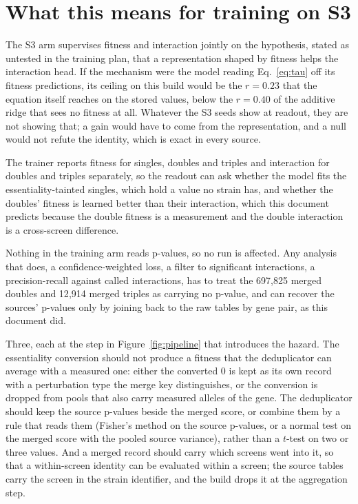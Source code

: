 
\section{What this means for training on S3}
\label{sec:consequences}

The S3 arm supervises fitness and interaction jointly on the hypothesis, stated as
untested in the training plan, that a representation shaped by fitness helps the
interaction head. If the mechanism were the model reading Eq.~\ref{eq:tau} off its
fitness predictions, its ceiling on this build would be the $r = 0.23$ that the
equation itself reaches on the stored values, below the $r = 0.40$ of the additive
ridge that sees no fitness at all. Whatever the S3 seeds show at readout, they are
not showing that; a gain would have to come from the representation, and a null would
not refute the identity, which is exact in every source.

The trainer reports fitness for singles, doubles and triples and interaction for
doubles and triples separately, so the readout can ask whether the model fits the
essentiality-tainted singles, which hold a value no strain has, and whether the
doubles' fitness is learned better than their interaction, which this document
predicts because the double fitness is a measurement and the double interaction is a
cross-screen difference.

Nothing in the training arm reads p-values, so no run is affected. Any analysis that
does, a confidence-weighted loss, a filter to significant interactions, a
precision-recall against called interactions, has to treat the 697{,}825 merged
doubles and 12{,}914 merged triples as carrying no p-value, and can recover the
sources' p-values only by joining back to the raw tables by gene pair, as this
document did.

Three, each at the step in Figure~\ref{fig:pipeline} that introduces the hazard.
The essentiality conversion should not produce a fitness that the deduplicator can
average with a measured one: either the converted 0 is kept as its own record with a
perturbation type the merge key distinguishes, or the conversion is dropped from
pools that also carry measured alleles of the gene. The deduplicator should keep the
source p-values beside the merged score, or combine them by a rule that reads them
(Fisher's method on the source p-values, or a normal test on the merged score with
the pooled source variance), rather than a $t$-test on two or three values. And a
merged record should carry which screens went into it, so that a within-screen
identity can be evaluated within a screen; the source tables carry the screen in the
strain identifier, and the build drops it at the aggregation step.
